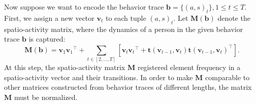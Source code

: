 Now suppose we want to encode the behavior trace $\mathbf{b} = \{(a,s)_t\}, 1 \leq t \leq T$. First, we assign a new vector $\mathbf{v}_t$ to each tuple $(a,s)_t$. Let $\mathbf{M}(\mathbf{b})$ denote the spatio-activity matrix, where the dynamics of a person in the given behavior trace $\mathbf{b}$ is captured:
\begin{equation}
\mathbf{M}(\mathbf{b}) = \mathbf{v}_1  {\mathbf{v}_1}^\intercal + \sum_{t\in[2, ..., T]} [\mathbf{v}_t {\mathbf{v}_t}^\intercal + \mathbf{t}(\mathbf{v}_{t-1}, \mathbf{v}_t) \mathbf{t}(\mathbf{v}_{t-1}, \mathbf{v}_t)^\intercal]
\label{eq:matrix}.
\end{equation}
\noindent
At this step, the spatio-activity matrix $\mathbf{M}$ registered element frequency in a spatio-activity vector and their transitions. In order to make $\mathbf{M}$ comparable to other matrices constructed from behavior traces of different lengths, the matrix $\mathbf{M}$ must be normalized.

